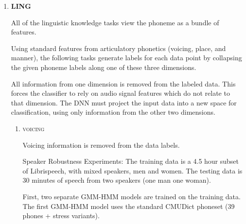 \documentclass[10pt,a4paper]{article}
\begin{document}
\begin{enumerate}
\newpage
\item \textbf{LING}

  All of the linguistic knowledge tasks view the phoneme as a bundle of features.

  Using standard features from articulatory phonetics (voicing, place, and manner), the following tasks generate labels for each data point by collapsing the given phoneme labels along one of these three dimensions.

  All information from one dimension is removed from the labeled data. This forces the classifier to rely on audio signal features which do not relate to that dimension. The DNN must project the input data into a new space for classification, using only information from the other two dimensions. 

  
  \begin{enumerate}
  \item \textsc{voicing}

    Voicing information is removed from the data labels.

    Speaker Robustness Experiments: The training data is a 4.5 hour subset of Librispeech, with mixed speakers, men and women. The testing data is 30 minutes of speech from two speakers (one man one woman).

    First, two separate GMM-HMM models are trained on the training data. The first GMM-HMM model uses the standard CMUDict phoneset (39 phones + stress variants).



\end{enumerate}
\end{enumerate}
\end{document}
